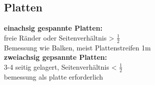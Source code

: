 	\begin{minipage}{\linewidth}
		
		\subsection{Platten}
			
			\textbf{einachsig gespannte Platten:} \\
				freie Ränder oder Seitenverhältnis > $ \frac{1}{2} $ \\
				Bemessung wie Balken, meist Plattenstreifen 1m \\
				
			\textbf{zweiachsig gepsannte Platten:}	\\
				3-4 seitig gelagert, Seitenverhältnis < $ \frac{1}{2} $ \\
				bemessung als platte erforderlich \\
			
			
	\end{minipage}
